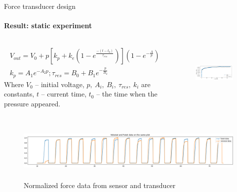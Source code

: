 \documentclass[aspectratio=169,xcolor=table]{beamer}
\begin{document}
\begin{frame}[t]{Force transducer design}
    \framesubtitle{Result: static experiment}
    \vspace{-0.5cm}
    \begin{columns}[T,onlytextwidth]
        \begin{column}{0.52\textwidth}
            \begin{eqnarray*}
                V_{out} = V_0 + p[k_p + k_e(1-e^\frac{-(t-t_0)}{\tau_{res}})](1-e^{-\frac{A}{p}}) \\
                k_p = A_1e^{-A_2p}; \tau_{res} = B_0 + B_1e^{-\frac{p}{B_2}}
            \end{eqnarray*}
            Where $V_0$ -- initial voltage, $p,\ A_i,\ B_i,\ \tau_{res},\ k_i$ are constants, $t$ -- current time, $t_0$ -- the time when the pressure appeared.
        \end{column}
        \begin{column}{0.45\textwidth}
            \vspace{-15pt}
            \begin{figure}[H]
                \centering\includegraphics[height=2.8cm,width=1\textwidth,keepaspectratio]{least_square_model.png}
                \label{fig:least_square_model.png}
            \end{figure}
        \end{column}
    \end{columns}
    \vspace{-11pt}
    \begin{figure}[H]
        \centering\includegraphics[height=3cm,width=1\textwidth,keepaspectratio]{pikes.png}
        \caption*{ Normalized force data from sensor and transducer}
        \label{fig:pikes.png}
    \end{figure}
\end{frame}
\end{document}
